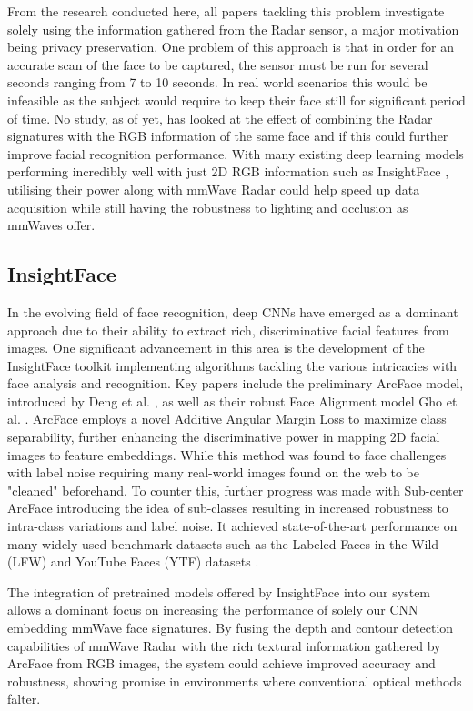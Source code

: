 \documentclass{interim}
\begin{document}
From the research conducted here, all papers tackling this problem investigate solely using the information gathered from the Radar sensor, a major motivation being privacy preservation. One problem of this approach is that in order for an accurate scan of the face to be captured, the sensor must be run for several seconds ranging from 7 to 10 seconds. In real world scenarios this would be infeasible as the subject would require to keep their face still for significant period of time. No study, as of yet, has looked at the effect of combining the Radar signatures with the RGB information of the same face and if this could further improve facial recognition performance. With many existing deep learning models performing incredibly well with just 2D RGB information such as InsightFace \cite{deng2018arcface}, utilising their power along with mmWave Radar could help speed up data acquisition while still having the robustness to lighting and occlusion as mmWaves offer. 


\subsection{InsightFace}
In the evolving field of face recognition, deep CNNs have emerged as a dominant approach due to their ability to extract rich, discriminative facial features from images. One significant advancement in this area is the development of the InsightFace toolkit implementing algorithms tackling the various intricacies with face analysis and recognition. Key papers include the preliminary ArcFace model, introduced by Deng et al. \cite{deng2018arcface}, as well as their robust Face Alignment model Gho et al. \cite{guo2018stacked}. ArcFace employs a novel Additive Angular Margin Loss to maximize class separability, further enhancing the discriminative power in mapping 2D facial images to feature embeddings. While this method was found to face challenges with label noise requiring many real-world images found on the web to be "cleaned" beforehand. To counter this, further progress was made with Sub-center ArcFace \cite{deng2020subcenter} introducing the idea of sub-classes resulting in increased robustness to intra-class variations and label noise. It achieved state-of-the-art performance on many widely used benchmark datasets such as the Labeled Faces in the Wild (LFW) \cite{huang2008labeled} and YouTube Faces (YTF) datasets \cite{wolf2011face}.

The integration of pretrained models offered by InsightFace into our system allows a dominant focus on increasing the performance of solely our CNN embedding mmWave face signatures. By fusing the depth and contour detection capabilities of mmWave Radar with the rich textural information gathered by ArcFace from RGB images, the system could achieve improved accuracy and robustness, showing promise in environments where conventional optical methods falter.
\end{document}
